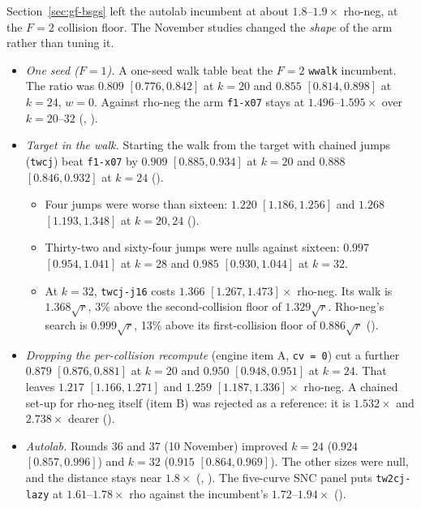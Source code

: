 Section~\ref{sec:gf-bsgs} left the autolab incumbent at about $1.8$--$1.9\times$
rho-neg, at the $F=2$ collision floor. The November studies changed the
\emph{shape} of the arm rather than tuning it.
\begin{itemize}
\item \emph{One seed ($F=1$).} A one-seed walk table beat the $F=2$
  \texttt{wwalk} incumbent. The ratio was $0.809$ $[0.776,0.842]$ at $k=20$ and
  $0.855$ $[0.814,0.898]$ at $k=24$, $w=0$. Against rho-neg the arm
  \texttt{f1-x07} stays at $1.496$--$1.595\times$ over $k=20$--$32$
  (,
  ).
\item \emph{Target in the walk.} Starting the walk from the target with chained jumps
  (\texttt{twcj}) beat \texttt{f1-x07} by $0.909$ $[0.885,0.934]$ at $k=20$
  and $0.888$ $[0.846,0.932]$ at $k=24$
  ().
  \begin{itemize}
  \item Four jumps were worse than sixteen: $1.220$ $[1.186,1.256]$ and
    $1.268$ $[1.193,1.348]$ at $k=20,24$
    ().
  \item Thirty-two and sixty-four jumps were nulls against sixteen:
    $0.997$ $[0.954,1.041]$ at $k=28$ and $0.985$ $[0.930,1.044]$ at $k=32$.
  \item At $k=32$, \texttt{twcj-j16} costs $1.366$ $[1.267,1.473]\times$
    rho-neg. Its walk is $1.368\sqrt r$, 3\% above the second-collision floor
    of $1.329\sqrt r$. Rho-neg's search is $0.999\sqrt r$, 13\% above its
    first-collision floor of $0.886\sqrt r$
    ().
  \end{itemize}
\item \emph{Dropping the per-collision recompute} (engine item A,
  \texttt{cv\,=\,0}) cut a further $0.879$ $[0.876,0.881]$ at $k=20$ and
  $0.950$ $[0.948,0.951]$ at $k=24$. That leaves $1.217$ $[1.166,1.271]$ and
  $1.259$ $[1.187,1.336]\times$ rho-neg. A chained set-up for rho-neg itself
  (item B) was rejected as a reference: it is $1.532\times$ and
  $2.738\times$ dearer ().
\item \emph{Autolab.} Rounds 36 and 37 (10 November) improved $k=24$
  ($0.924$ $[0.857,0.996]$) and $k=32$ ($0.915$ $[0.864,0.969]$). The other
  sizes were null, and the distance stays near $1.8\times$
  (,
  ). The five-curve SNC panel puts \texttt{tw2cj-lazy} at
  $1.61$--$1.78\times$ rho against the incumbent's $1.72$--$1.94\times$
  ().
\end{itemize}

